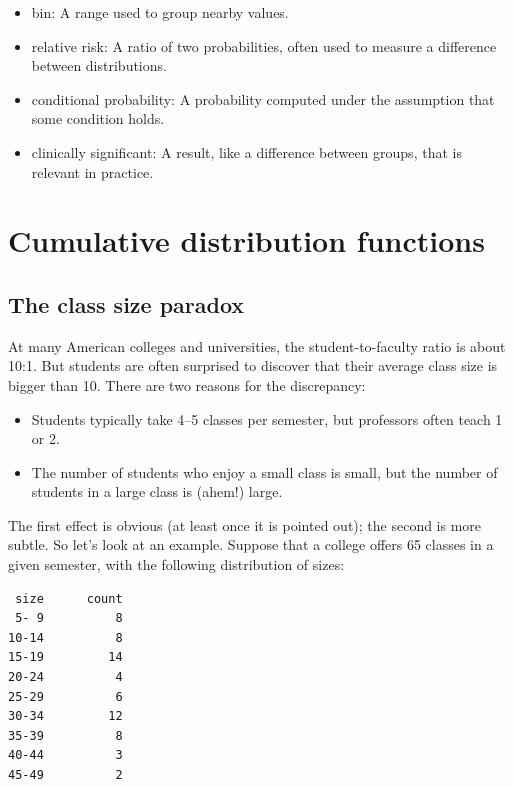 \documentclass[12pt]{book}
\begin{document}
\begin{itemize}
\item bin: A range used to group nearby values.

\item relative risk: A ratio of two probabilities, often used to measure
a difference between distributions.

\item conditional probability: A probability computed under the assumption
that some condition holds.

\item clinically significant: A result, like a difference between groups,
that is relevant in practice.

\end{itemize}


\chapter{Cumulative distribution functions}
\label{cumulative}

\section{The class size paradox}

At many American colleges and universities, the student-to-faculty
ratio is about 10:1.  But students are often surprised to discover
that their average class size is bigger than 10.  There
are two reasons for the discrepancy:

\begin{itemize}

\item Students typically take 4--5 classes per semester, but
professors often teach 1 or 2.

\item The number of students who enjoy a small class is small,
but the number of students in a large class is (ahem!) large.

\end{itemize}

The first effect is obvious (at least once it is pointed out);
the second is more subtle.  So let's look at an example.  Suppose
that a college offers 65 classes in a given semester, with the
following distribution of sizes:
%
\begin{verbatim}
 size      count
 5- 9          8
10-14          8
15-19         14
20-24          4
25-29          6
30-34         12
35-39          8
40-44          3
45-49          2
\end{verbatim}
\end{document}
